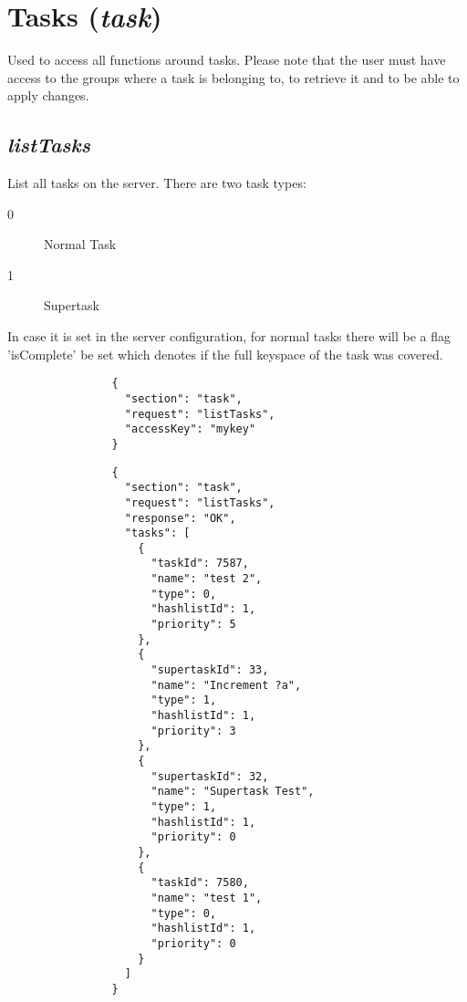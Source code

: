 	\section*{Tasks (\textit{task})}
		Used to access all functions around tasks. Please note that the user must have access to the groups where a task is belonging to, to retrieve it and to be able to apply changes.
		\subsection*{\textit{listTasks}}
			List all tasks on the server. There are two task types:
			\begin{description}
				\item[0] Normal Task
				\item[1] Supertask
			\end{description}
			In case it is set in the server configuration, for normal tasks there will be a flag 'isComplete' be set which denotes if the full keyspace of the task was covered.
			{
				\color{blue}
				\begin{verbatim}
				{
				  "section": "task",
				  "request": "listTasks",
				  "accessKey": "mykey"
				}
				\end{verbatim}
			}
			{
				\color{OliveGreen}
				\begin{verbatim}
				{
				  "section": "task",
				  "request": "listTasks",
				  "response": "OK",
				  "tasks": [
				    {
				      "taskId": 7587,
				      "name": "test 2",
				      "type": 0,
				      "hashlistId": 1,
				      "priority": 5
				    },
				    {
				      "supertaskId": 33,
				      "name": "Increment ?a",
				      "type": 1,
				      "hashlistId": 1,
				      "priority": 3
				    },
				    {
				      "supertaskId": 32,
				      "name": "Supertask Test",
				      "type": 1,
				      "hashlistId": 1,
				      "priority": 0
				    },
				    {
				      "taskId": 7580,
				      "name": "test 1",
				      "type": 0,
				      "hashlistId": 1,
				      "priority": 0
				    }
				  ]
				}
				\end{verbatim}
			}

